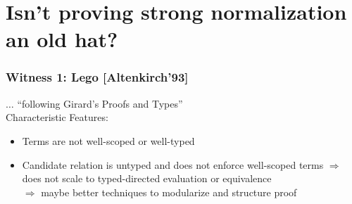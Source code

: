 \documentclass{beamer}
\begin{document}



\section{Isn't proving strong normalization an old hat?}

\begin{frame}\frametitle{Witness 1: Lego [Altenkirch'93]}

$\ldots$ ``following Girard's Proofs and Types''
\\[1em]
Characteristic Features:
  \begin{itemize}
    \item Terms are not well-scoped or well-typed
    \item Candidate relation is untyped and does not enforce
      well-scoped terms
$\Longrightarrow$ does not scale to typed-directed evaluation or equivalence\\
$\Longrightarrow$ maybe better techniques to modularize and structure proof
  \end{itemize}

\end{frame}
\end{document}

